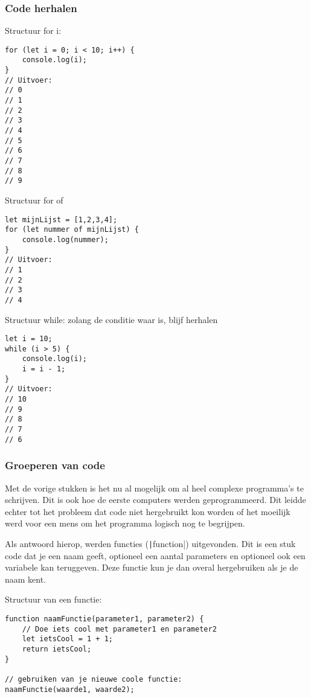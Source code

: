 \subsubsection{Code herhalen}%
\label{ssub:Code herhalen}

Structuur for i:
\begin{verbatim}
for (let i = 0; i < 10; i++) {
    console.log(i);
}
// Uitvoer:
// 0
// 1
// 2
// 3
// 4
// 5
// 6
// 7
// 8
// 9
\end{verbatim}

Structuur for of
\begin{verbatim}
let mijnLijst = [1,2,3,4];
for (let nummer of mijnLijst) {
    console.log(nummer);
}
// Uitvoer:
// 1
// 2
// 3
// 4
\end{verbatim}

Structuur while: zolang de conditie waar is, blijf herhalen
\begin{verbatim}
let i = 10;
while (i > 5) {
    console.log(i);
    i = i - 1;
}
// Uitvoer:
// 10
// 9
// 8
// 7
// 6
\end{verbatim}

\subsubsection{Groeperen van code}%
\label{ssub:Groeperen van code}

Met de vorige stukken is het nu al mogelijk om al heel complexe programma's te
schrijven. Dit is ook hoe de eerste computers werden geprogrammeerd. Dit leidde 
echter tot het probleem dat code niet hergebruikt kon worden of het moeilijk 
werd voor een mens om het programma logisch nog te begrijpen.

Als antwoord hierop, werden functies (\texttt|function|)
uitgevonden. Dit is een stuk code dat je een naam geeft, optioneel een aantal
parameters en optioneel ook een variabele kan teruggeven. Deze functie kun je
dan overal hergebruiken als je de naam kent.

Structuur van een functie:
\begin{verbatim}
function naamFunctie(parameter1, parameter2) {
    // Doe iets cool met parameter1 en parameter2
    let ietsCool = 1 + 1;
    return ietsCool;
}

// gebruiken van je nieuwe coole functie:
naamFunctie(waarde1, waarde2);
\end{verbatim}

